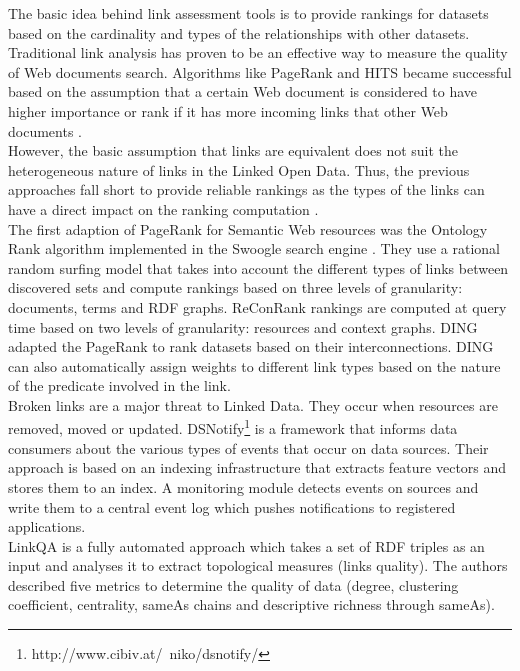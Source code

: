 \documentclass[onecolumn, crcready]{iosart2c}
\begin{document}
The basic idea behind link assessment tools is to provide rankings for datasets based on the cardinality and types of the relationships with other datasets. Traditional link analysis has proven to be an effective way to measure the quality of Web documents search. Algorithms like PageRank \cite{Lawrence981} and HITS \cite{Kleinberg:1999} became successful based on the assumption that a certain Web document is considered to have higher importance or rank if it has more incoming links that other Web documents \cite{Brin:1998}\cite{Chakrabarti99miningthe}.\\ However, the basic assumption that links are equivalent does not suit the heterogeneous nature of links in the Linked Open Data. Thus, the previous approaches fall short to provide reliable rankings as the types of the links can have a direct impact on the ranking computation \cite{Toupikov2009}.\\ The first adaption of PageRank for Semantic Web resources was the Ontology Rank algorithm implemented in the Swoogle search engine \cite{Ding2004}. They use a rational random surfing model that takes into account the different types of links between discovered sets and compute rankings based on three levels of granularity: documents, terms and RDF graphs. ReConRank \cite{Hogan06reconrank:a} rankings are computed at query time based on two levels of granularity: resources and context graphs. DING \cite{Toupikov2009} adapted the PageRank to rank datasets based on their interconnections. DING can also automatically assign weights to different link types based on the nature of the predicate involved in the link.\\Broken links are a major threat to Linked Data. They occur when resources are removed, moved or updated. DSNotify\footnote{http://www.cibiv.at/~niko/dsnotify/}\cite{cs142} is a framework that informs data consumers about the various types of events that occur on data sources. Their approach is based on an indexing infrastructure that extracts feature vectors and stores them to an index. A monitoring module detects events on sources and write them to a central event log which pushes notifications to registered applications.\\ LinkQA \cite{Gueret2012} is a fully automated approach which takes a set of RDF triples as an input and analyses it to extract topological measures (links quality). The authors described five metrics to determine the quality of data (degree, clustering coefficient, centrality, sameAs chains and descriptive richness through sameAs).\\
\end{document}
